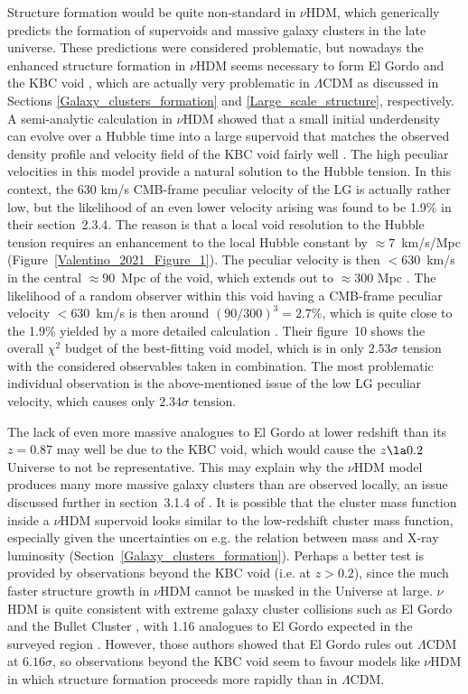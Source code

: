 \documentclass[fleqn,usenatbib,useAMS]{mnras} %
\begin{document}
Structure formation would be quite non-standard in $\nu$HDM, which generically predicts the formation of supervoids \citep{Angus_Diaferio_2011} and massive galaxy clusters \citep{Angus_2013} in the late universe. These predictions were considered problematic, but nowadays the enhanced structure formation in $\nu$HDM seems necessary to form El Gordo \citep{Asencio_2021} and the KBC void \citep{Haslbauer_2020}, which are actually very problematic in $\Lambda$CDM as discussed in Sections \ref{Galaxy_clusters_formation} and \ref{Large_scale_structure}, respectively. A semi-analytic calculation in $\nu$HDM showed that a small initial underdensity can evolve over a Hubble time into a large supervoid that matches the observed density profile and velocity field of the KBC void fairly well \citep{Haslbauer_2020}. The high peculiar velocities in this model provide a natural solution to the Hubble tension. In this context, the 630 km/s CMB-frame peculiar velocity of the LG is actually rather low, but the likelihood of an even lower velocity arising was found to be 1.9\% in their section~2.3.4. The reason is that a local void resolution to the Hubble tension requires an enhancement to the local Hubble constant by $\approx 7$~km/s/Mpc (Figure~\ref{Valentino_2021_Figure_1}). The peculiar velocity is then $<630$~km/s in the central $\approx 90$~Mpc of the void, which extends out to $\approx 300$ Mpc \citep{Keenan_2013}. The likelihood of a random observer within this void having a CMB-frame peculiar velocity $<630$~km/s is then around $\left(90/300\right)^3 = 2.7\%$, which is quite close to the 1.9\% yielded by a more detailed calculation \citep{Haslbauer_2020}. Their figure~10 shows the overall $\chi^2$ budget of the best-fitting void model, which is in only $2.53\sigma$ tension with the considered observables taken in combination. The most problematic individual observation is the above-mentioned issue of the low LG peculiar velocity, which causes only $2.34\sigma$ tension.

The lack of even more massive analogues to El Gordo at lower redshift than its $z = 0.87$ \citep{Menanteau_2012} may well be due to the KBC void, which would cause the $z \la 0.2$ Universe to not be representative. This may explain why the $\nu$HDM model produces many more massive galaxy clusters than are observed locally, an issue discussed further in section~3.1.4 of \citet{Haslbauer_2020}. It is possible that the cluster mass function inside a $\nu$HDM supervoid looks similar to the low-redshift cluster mass function, especially given the uncertainties on e.g. the relation between mass and X-ray luminosity (Section~\ref{Galaxy_clusters_formation}). Perhaps a better test is provided by observations beyond the KBC void (i.e. at $z > 0.2$), since the much faster structure growth in $\nu$HDM cannot be masked in the Universe at large. $\nu$HDM is quite consistent with extreme galaxy cluster collisions such as El Gordo and the Bullet Cluster \citep{Katz_2013}, with 1.16 analogues to El Gordo expected in the surveyed region \citep{Asencio_2021}. However, those authors showed that El Gordo rules out $\Lambda$CDM at $6.16\sigma$, so observations beyond the KBC void seem to favour models like $\nu$HDM in which structure formation proceeds more rapidly than in $\Lambda$CDM.
\end{document}
